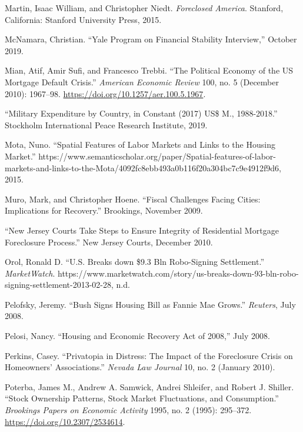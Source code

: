 \documentclass[12pt,oneside]{psthesis}
\begin{document}
\leavevmode\hypertarget{ref-martin2015foreclosed}{}%
Martin, Isaac William, and Christopher Niedt. \emph{Foreclosed America}. Stanford, California: Stanford University Press, 2015.

\leavevmode\hypertarget{ref-mcnamara2019yale}{}%
McNamara, Christian. ``Yale Program on Financial Stability Interview,'' October 2019.

\leavevmode\hypertarget{ref-mianPoliticalEconomyUS2010}{}%
Mian, Atif, Amir Sufi, and Francesco Trebbi. ``The Political Economy of the US Mortgage Default Crisis.'' \emph{American Economic Review} 100, no. 5 (December 2010): 1967--98. \url{https://doi.org/10.1257/aer.100.5.1967}.

\leavevmode\hypertarget{ref-2019military}{}%
``Military Expenditure by Country, in Constant (2017) US\$ M., 1988-2018.'' Stockholm International Peace Research Institute, 2019.

\leavevmode\hypertarget{ref-mota2015spatial}{}%
Mota, Nuno. ``Spatial Features of Labor Markets and Links to the Housing Market.'' https://www.semanticscholar.org/paper/Spatial-features-of-labor-markets-and-links-to-the-Mota/4092fc8ebb493a0b116f20a304bc7c9e4912f9d6, 2015.

\leavevmode\hypertarget{ref-muro2009fiscal}{}%
Muro, Mark, and Christopher Hoene. ``Fiscal Challenges Facing Cities: Implications for Recovery.'' Brookings, November 2009.

\leavevmode\hypertarget{ref-comfort2010new}{}%
``New Jersey Courts Take Steps to Ensure Integrity of Residential Mortgage Foreclosure Process.'' New Jersey Courts, December 2010.

\leavevmode\hypertarget{ref-orolbreaks}{}%
Orol, Ronald D. ``U.S. Breaks down \$9.3 Bln Robo-Signing Settlement.'' \emph{MarketWatch}. https://www.marketwatch.com/story/us-breaks-down-93-bln-robo-signing-settlement-2013-02-28, n.d.

\leavevmode\hypertarget{ref-pelofsky2008bush}{}%
Pelofsky, Jeremy. ``Bush Signs Housing Bill as Fannie Mae Grows.'' \emph{Reuters}, July 2008.

\leavevmode\hypertarget{ref-pelosi2008housing}{}%
Pelosi, Nancy. ``Housing and Economic Recovery Act of 2008,'' July 2008.

\leavevmode\hypertarget{ref-perkins2010privatopia}{}%
Perkins, Casey. ``Privatopia in Distress: The Impact of the Foreclosure Crisis on Homeowners' Associations.'' \emph{Nevada Law Journal} 10, no. 2 (January 2010).

\leavevmode\hypertarget{ref-poterba1995stock}{}%
Poterba, James M., Andrew A. Samwick, Andrei Shleifer, and Robert J. Shiller. ``Stock Ownership Patterns, Stock Market Fluctuations, and Consumption.'' \emph{Brookings Papers on Economic Activity} 1995, no. 2 (1995): 295--372. \url{https://doi.org/10.2307/2534614}.
\end{document}
